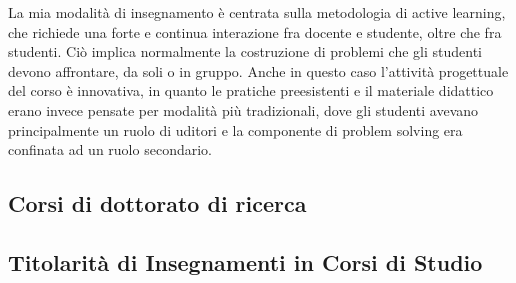 \documentclass[11pt,a4paper,roman]{moderncv}        %
\begin{document}
  La mia modalità di insegnamento è centrata sulla metodologia di active
  learning, che richiede una forte e continua interazione fra docente e
  studente, oltre che fra studenti. Ciò implica normalmente la costruzione
  di problemi che gli studenti devono affrontare, da soli o in gruppo.
  Anche in questo caso l'attività progettuale del corso è innovativa, in
  quanto le pratiche preesistenti e il materiale didattico erano invece
  pensate per modalità più tradizionali, dove gli studenti avevano
  principalmente un ruolo di uditori e la componente di problem solving
  era confinata ad un ruolo secondario.

\subsection{Corsi di dottorato di  ricerca}



\subsection{Titolarità di Insegnamenti in Corsi di
Studio}
\end{document}
